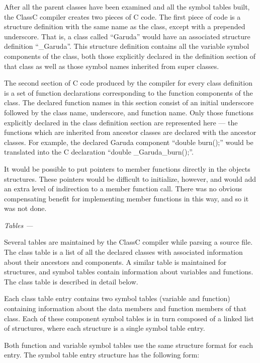 After all the parent classes have been examined and all the symbol tables
built, the ClassC compiler creates two pieces of C code.  The first
piece of code is a structure definition with the same name as the class,
except with a prepended underscore.  That is, a class called ``Garuda'' would
have an associated structure definition ``\_Garuda''.  This structure definition
contains all the variable symbol components of the class, both those
explicitly declared in the definition section of that class as well as those
symbol names inherited from super classes.

The second section of C code produced by the compiler for every class
definition is a set of function declarations corresponding to the function
components of the class.  The declared function names in this section
consist of an initial underscore followed by the class name, underscore,
and function name.  Only those functions explicitly declared in the
class definition section are represented here --- the functions which are
inherited from ancestor classes are declared with the ancestor classes.
For example, the declared Garuda component ``double burn();'' would be
translated into the C declaration ``double \_Garuda\_burn();''.

It would be possible to put pointers to member functions directly in
the objects structures.  These pointers would be difficult to
initialize, however, and would add an extra level of indirection to
a member function call.  There was no obvious compensating benefit
for implementing member functions in this way, and so it was not done.


{\noindent \large \em Tables ---}

Several tables are maintained by the ClassC compiler while parsing
a source file.  The class table is a list of all the declared classes with
associated information about their ancestors and components.
A similar table is maintained for structures, and symbol tables
contain information about variables and functions.
The class table is described in detail below.

Each class table entry contains two symbol tables (variable and function)
containing information about the data members and function members of
that class.
Each of these component symbol tables is in turn composed of a linked
list of structures, where each
structure is a single symbol table entry.

Both function and variable symbol tables use the same structure format
for each entry.
The symbol table entry structure has the following form:

